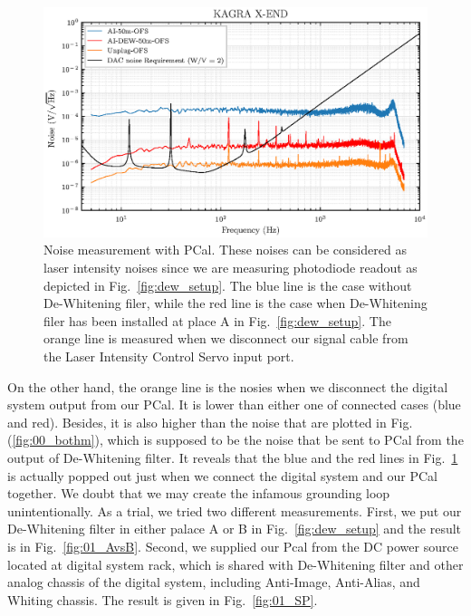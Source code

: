 \begin{figure}[hbt!]
\centering
\includegraphics[width=1\textwidth]{figure/noise/01_all}
\caption[Noise]{ Noise measurement with PCal. These noises can be considered as laser intensity noises since we are measuring photodiode readout as depicted in Fig.~\ref{fig:dew_setup}. The blue line is the case without De-Whitening filer, while the red line is the case when De-Whitening filer has been installed at place A in Fig.~\ref{fig:dew_setup}. The orange line is measured when we disconnect our signal cable from the Laser Intensity Control Servo input port.}
\label{fig:01_all}
\end{figure}

On the other hand, the orange line is the nosies when we disconnect the digital system output from our PCal. It is lower than either one of connected cases (blue and red). Besides, it is also higher than the noise that are plotted in Fig.(\ref{fig:00_bothm}), which is supposed to be the noise that be sent to PCal from the output of De-Whitening filter. It reveals that the blue and the red lines in Fig.~\ref{fig:01_all} is actually popped out just when we connect the digital system and our PCal together. We doubt that we may create the infamous grounding loop unintentionally. As a trial, we tried two different measurements. First, we put our De-Whitening filter in either palace A or B in Fig.~\ref{fig:dew_setup} and the result is in Fig.~\ref{fig:01_AvsB}. Second, we supplied our Pcal from the DC power source located at digital system rack, which is shared with De-Whitening filter and other analog chassis of the digital system, including Anti-Image, Anti-Alias, and Whiting chassis. The result is given in Fig.~\ref{fig:01_SP}.

